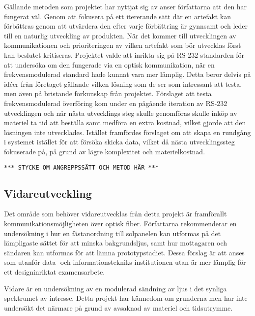         Gällande metoden som projektet har nyttjat sig av anser författarna att den har fungerat väl. Genom att fokusera på ett itererande sätt där en artefakt kan förbättras genom att utvärdera den efter varje förbättring är gynnsamt och leder till en naturlig utveckling av produkten. När det kommer till utvecklingen av kommunikationen och prioriteringen av vilken artefakt som bör utvecklas först kan beslutet kritiseras. Projektet valde att inrikta sig på RS-232 standarden för att undersöka om den fungerade via en optisk kommunikation, när en frekvensmodulerad standard hade kunnat vara mer lämplig. Detta beror delvis på idéer från företaget gällande vilken lösning som de ser som intressant att testa, men även på bristande förkunskap från projektet. Förslaget att testa frekvensmodulerad överföring kom under en pågående iteration av RS-232 utvecklingen och när nästa utvecklings steg skulle genomföras skulle inköp av materiel ta tid att beställa samt medföra en extra kostnad, vilket gjorde att den lösningen inte utvecklades. Istället framfördes förslaget om att skapa en rundgång i systemet istället för att försöka skicka data, vilket då nästa utvecklingssteg fokuserade på, på grund av lägre komplexitet och materielkostnad.\bigskip 

        \texttt{*** STYCKE OM ANGREPPSSÄTT OCH METOD HÄR ***}

    \subsection{Vidareutveckling} %
    \label{sub:vidareutveckling}
        Det område som behöver vidareutvecklas från detta projekt är framförallt kommunikationsmöjligheten över optisk fiber. Författarna rekommenderar en undersökning i hur en fästanordning till solpanelen kan utformas på det lämpligaste sättet för att minska bakgrundsljus, samt hur mottagaren och sändaren kan utformas för att lämna prototypstadiet. Dessa förslag är att anses som utanför data- och informationstekniks institutionen utan är mer lämplig för ett designinriktat examensarbete. \bigskip

        Vidare är en undersökning av en modulerad sändning av ljus i det synliga spektrumet av intresse. Detta projekt har kännedom om grunderna men har inte undersökt det närmare på grund av avsaknad av materiel och tidsutrymme.
    
